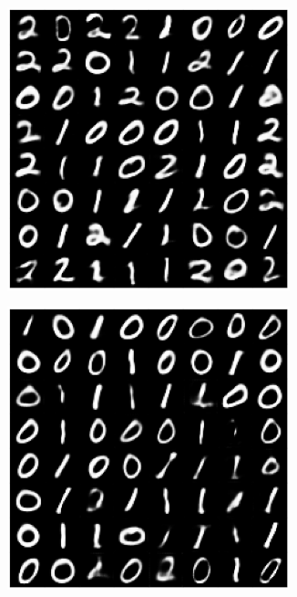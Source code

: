 \begin{figure}[htb]
    \centering
    \begin{subfigure}{0.24\textwidth}
        \centering
        \includegraphics[width=0.9\textwidth]{Figures/PS_v2/genrkm-bMNIST012-gensamples.png}
    \end{subfigure}
    \hfill
    \begin{subfigure}{0.24\textwidth}
        \centering
        \includegraphics[width=0.9\textwidth]{Figures/PS_v2/genrkm-ubMNIST012-gensamples.png}

\end{subfigure}
\end{figure}
